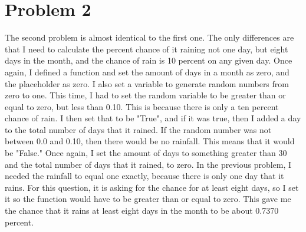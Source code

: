 \documentclass[twocolumn]{revtex4}
\begin{document}
\section{Problem 2}
The second problem is almost identical to the first one. The only differences are that I need to calculate the percent chance of it raining not one day, but eight days in the month, and the chance of rain is 10 percent on any given day. Once again, I defined a function and set the amount of days in a month as zero, and the placeholder as zero. I also set a variable to generate random numbers from zero to one. This time, I had to set the random variable to be greater than or equal to zero, but less than 0.10. This is because there is only a ten percent chance of rain. I then set that to be "True", and if it was true, then I added a day to the total number of days that it rained. If the random number was not between 0.0 and 0.10, then there would be no rainfall. This means that it would be "False." Once again, I set the amount of days to something greater than 30 and the total number of days that it rained, to zero. In the previous problem, I needed the rainfall to equal one exactly, because there is only one day that it rains. For this question, it is asking for the chance for at least eight days, so I set it so the function would have to be greater than or equal to zero. This gave me the chance that it rains at least eight days in the month to be about 0.7370 percent. 
\end{document}
